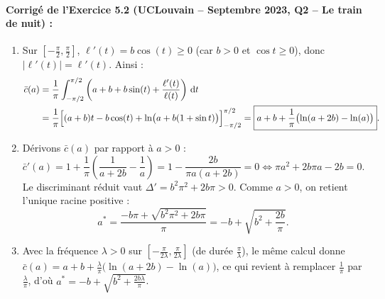 \paragraph{Corrigé de l'Exercice 5.2 (UCLouvain -- Septembre 2023, Q2 -- Le train de nuit) :}
\begin{enumerate}[label=(\alph*)]
    \item Sur $\left[-\frac{\pi}{2}, \frac{\pi}{2}\right]$, $\ell'(t) = b\cos(t) \ge 0$ (car $b > 0$ et $\cos t \ge 0$), donc $|\ell'(t)| = \ell'(t)$. Ainsi :
    \begin{align*}
        \bar{c}(a) &= \frac{1}{\pi}\int_{-\pi/2}^{\pi/2} \left(a + b + b\sin(t) + \frac{\ell'(t)}{\ell(t)}\right)\,\mathrm{d} t \\
        &= \frac{1}{\pi}\Bigl[(a+b)t - b\cos(t) + \ln\bigl(a + b(1+\sin t)\bigr)\Bigr]_{-\pi/2}^{\pi/2} = \boxed{a + b + \frac{1}{\pi}\bigl(\ln(a + 2b) - \ln(a)\bigr)}.
    \end{align*}
    \item Dérivons $\bar{c}(a)$ par rapport à $a > 0$ :
    \[
        \bar{c}'(a) = 1 + \frac{1}{\pi}\left(\frac{1}{a + 2b} - \frac{1}{a}\right) = 1 - \frac{2b}{\pi a(a+2b)} = 0 \iff \pi a^2 + 2b\pi a - 2b = 0.
    \]
    Le discriminant réduit vaut $\Delta' = b^2\pi^2 + 2b\pi > 0$. Comme $a > 0$, on retient l'unique racine positive :
    \[
        \boxed{a^* = \frac{-b\pi + \sqrt{b^2\pi^2 + 2b\pi}}{\pi} = -b + \sqrt{b^2 + \frac{2b}{\pi}}}.
    \]
    \item Avec la fréquence $\lambda > 0$ sur $\left[-\frac{\pi}{2\lambda}, \frac{\pi}{2\lambda}\right]$ (de durée $\frac{\pi}{\lambda}$), le même calcul donne $\bar{c}(a) = a + b + \frac{\lambda}{\pi}\bigl(\ln(a+2b) - \ln(a)\bigr)$, ce qui revient à remplacer $\frac{1}{\pi}$ par $\frac{\lambda}{\pi}$, d'où $\boxed{a^* = -b + \sqrt{b^2 + \frac{2b\lambda}{\pi}}}$.
\end{enumerate}

